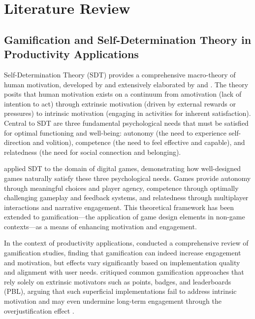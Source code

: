 
\chapter{Literature Review}
\label{chap:literature-review}

\section{Gamification and Self-Determination Theory in Productivity Applications}
\label{sec:gamification-sdt}

\inprogress

Self-Determination Theory (SDT) provides a comprehensive macro-theory of human motivation, developed by \citet{deci1985intrinsic} and extensively elaborated by \citet{ryan2000self} and \citet{deci2017self}. The theory posits that human motivation exists on a continuum from amotivation (lack of intention to act) through extrinsic motivation (driven by external rewards or pressures) to intrinsic motivation (engaging in activities for inherent satisfaction). Central to SDT are three fundamental psychological needs that must be satisfied for optimal functioning and well-being: autonomy (the need to experience self-direction and volition), competence (the need to feel effective and capable), and relatedness (the need for social connection and belonging).

\citet{ryan2006motivational} applied SDT to the domain of digital games, demonstrating how well-designed games naturally satisfy these three psychological needs. Games provide autonomy through meaningful choices and player agency, competence through optimally challenging gameplay and feedback systems, and relatedness through multiplayer interactions and narrative engagement. This theoretical framework has been extended to gamification---the application of game design elements in non-game contexts---as a means of enhancing motivation and engagement.

In the context of productivity applications, \citet{hamari2014does} conducted a comprehensive review of gamification studies, finding that gamification can indeed increase engagement and motivation, but effects vary significantly based on implementation quality and alignment with user needs. \citet{nicholson2015recipe} critiqued common gamification approaches that rely solely on extrinsic motivators such as points, badges, and leaderboards (PBL), arguing that such superficial implementations fail to address intrinsic motivation and may even undermine long-term engagement through the overjustification effect \citep{deci1999meta}.

